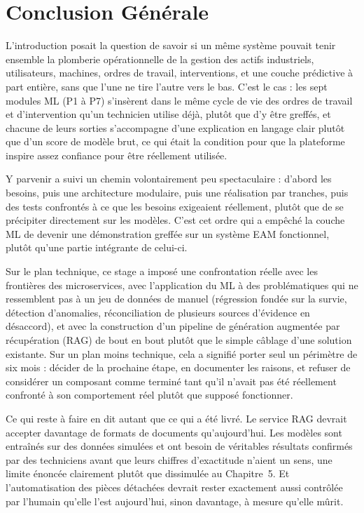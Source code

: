 \chapter*{Conclusion Générale}

L'introduction posait la question de savoir si un même système pouvait tenir ensemble la plomberie opérationnelle de la gestion des actifs industriels, utilisateurs, machines, ordres de travail, interventions, et une couche prédictive à part entière, sans que l'une ne tire l'autre vers le bas. C'est le cas : les sept modules ML (P1 à P7) s'insèrent dans le même cycle de vie des ordres de travail et d'intervention qu'un technicien utilise déjà, plutôt que d'y être greffés, et chacune de leurs sorties s'accompagne d'une explication en langage clair plutôt que d'un score de modèle brut, ce qui était la condition pour que la plateforme inspire assez confiance pour être réellement utilisée.

Y parvenir a suivi un chemin volontairement peu spectaculaire : d'abord les besoins, puis une architecture modulaire, puis une réalisation par tranches, puis des tests confrontés à ce que les besoins exigeaient réellement, plutôt que de se précipiter directement sur les modèles. C'est cet ordre qui a empêché la couche ML de devenir une démonstration greffée sur un système EAM fonctionnel, plutôt qu'une partie intégrante de celui-ci.

Sur le plan technique, ce stage a imposé une confrontation réelle avec les frontières des microservices, avec l'application du ML à des problématiques qui ne ressemblent pas à un jeu de données de manuel (régression fondée sur la survie, détection d'anomalies, réconciliation de plusieurs sources d'évidence en désaccord), et avec la construction d'un pipeline de génération augmentée par récupération (RAG) de bout en bout plutôt que le simple câblage d'une solution existante. Sur un plan moins technique, cela a signifié porter seul un périmètre de six mois : décider de la prochaine étape, en documenter les raisons, et refuser de considérer un composant comme terminé tant qu'il n'avait pas été réellement confronté à son comportement réel plutôt que supposé fonctionner.

Ce qui reste à faire en dit autant que ce qui a été livré. Le service RAG devrait accepter davantage de formats de documents qu'aujourd'hui. Les modèles sont entraînés sur des données simulées et ont besoin de véritables résultats confirmés par des techniciens avant que leurs chiffres d'exactitude n'aient un sens, une limite énoncée clairement plutôt que dissimulée au Chapitre~5. Et l'automatisation des pièces détachées devrait rester exactement aussi contrôlée par l'humain qu'elle l'est aujourd'hui, sinon davantage, à mesure qu'elle mûrit.
